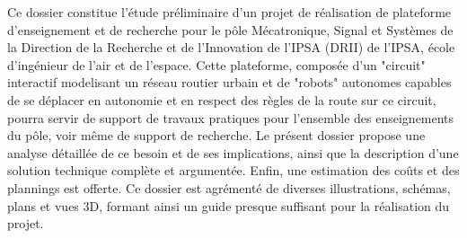 Ce dossier constitue l'étude préliminaire d'un projet de réalisation de plateforme d'enseignement et de recherche pour le pôle Mécatronique, Signal et Systèmes de la Direction de la Recherche et de l’Innovation de l’IPSA (DRII) de l'IPSA, école d'ingénieur de l'air et de l'espace.
Cette plateforme, composée d'un "circuit" interactif modelisant un réseau routier urbain et de "robots" autonomes capables de se déplacer en autonomie et en respect des règles de la route sur ce circuit, pourra servir de support de travaux pratiques pour l'ensemble des enseignements du pôle, voir même de support de recherche.
Le présent dossier propose une analyse détaillée de ce besoin et de ses implications, ainsi que la description d'une solution technique complète et argumentée. Enfin, une estimation des coûts et des plannings est offerte.
Ce dossier est agrémenté de diverses illustrations, schémas, plans et vues 3D, formant ainsi un guide presque suffisant pour la réalisation du projet.